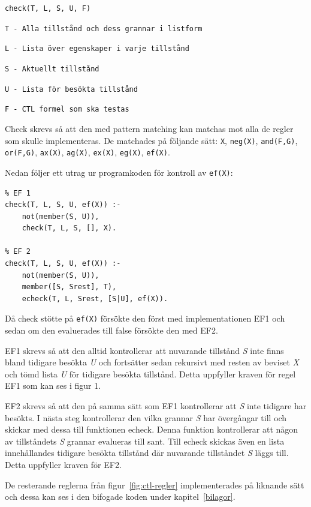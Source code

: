 \begin{center}
\begin{minipage}{0.75\textwidth}

\texttt{check(T, L, S, U, F)}

\texttt{T - Alla tillstånd och dess grannar i listform}

\texttt{L - Lista över egenskaper i varje tillstånd}

\texttt{S - Aktuellt tillstånd}

\texttt{U - Lista för besökta tillstånd}

\texttt{F - CTL formel som ska testas}

\end{minipage}
\end{center}

Check skrevs så att den med pattern matching kan matchas mot alla de regler som skulle implementeras. De matchades på följande sätt: \texttt{X}, \texttt{neg(X)}, \texttt{and(F,G)}, \texttt{or(F,G)}, \texttt{ax(X)}, \texttt{ag(X)}, \texttt{ex(X)}, \texttt{eg(X)}, \texttt{ef(X)}.

Nedan följer ett utrag ur programkoden för kontroll av \texttt{ef(X)}:

\begin{center}
\begin{minipage}{0.6\textwidth}

\begin{lstlisting}
% EF 1
check(T, L, S, U, ef(X)) :-
	not(member(S, U)),
	check(T, L, S, [], X).

% EF 2
check(T, L, S, U, ef(X)) :-
	not(member(S, U)),
	member([S, Srest], T),
	echeck(T, L, Srest, [S|U], ef(X)).
\end{lstlisting}


\end{minipage}
\end{center}


Då check stötte på \texttt{ef(X)} försökte den först med implementationen EF1 och
sedan om den evaluerades till false försökte den med EF2.

EF1 skrevs så att den alltid kontrollerar att nuvarande tillstånd \textit{S} inte finns bland tidigare besökta \textit{U} och fortsätter sedan rekursivt med resten av beviset \textit{X} och tömd lista \textit{U} för tidigare besökta tillstånd. Detta uppfyller kraven för regel EF1 som kan ses i figur 1.

EF2 skrevs så att den på samma sätt som EF1 kontrollerar att \textit{S} inte
tidigare har besökts. I nästa steg kontrollerar den vilka grannar \textit{S} har
övergångar till och skickar med dessa till funktionen echeck. Denna funktion kontrollerar att
någon av tillståndets \textit{S} grannar evalueras till sant. Till echeck skickas även en lista innehållandes tidigare besökta tillstånd där nuvarande tillståndet \textit{S} läggs till. Detta uppfyller
kraven för EF2.

De resterande reglerna från figur~\ref{fig:ctl-regler} implementerades på liknande sätt och dessa kan ses i den bifogade koden under kapitel~\ref{bilagor}.
